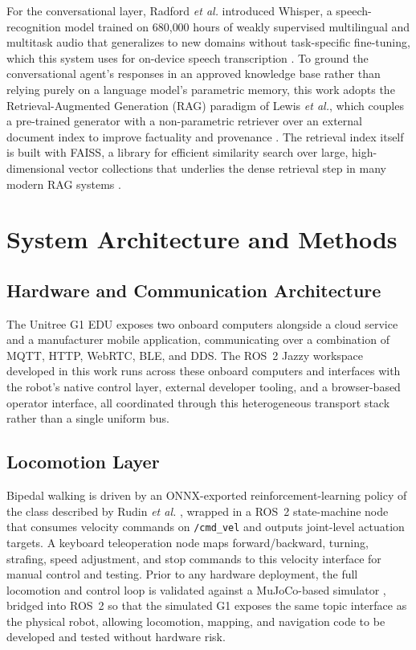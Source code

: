\documentclass[10pt,twocolumn]{article}
\begin{document}
For the conversational layer, Radford \emph{et al.} introduced Whisper, a speech-recognition model trained on 680{,}000 hours of weakly supervised multilingual and multitask audio that generalizes to new domains without task-specific fine-tuning, which this system uses for on-device speech transcription \cite{radford2023whisper}. To ground the conversational agent's responses in an approved knowledge base rather than relying purely on a language model's parametric memory, this work adopts the Retrieval-Augmented Generation (RAG) paradigm of Lewis \emph{et al.}, which couples a pre-trained generator with a non-parametric retriever over an external document index to improve factuality and provenance \cite{lewis2020rag}. The retrieval index itself is built with FAISS, a library for efficient similarity search over large, high-dimensional vector collections that underlies the dense retrieval step in many modern RAG systems \cite{johnson2019faiss}.

\section{System Architecture and Methods}

\subsection{Hardware and Communication Architecture}
The Unitree G1 EDU exposes two onboard computers alongside a cloud service and a manufacturer mobile application, communicating over a combination of MQTT, HTTP, WebRTC, BLE, and DDS. The ROS~2 Jazzy workspace developed in this work runs across these onboard computers and interfaces with the robot's native control layer, external developer tooling, and a browser-based operator interface, all coordinated through this heterogeneous transport stack rather than a single uniform bus.

\subsection{Locomotion Layer}
Bipedal walking is driven by an ONNX-exported reinforcement-learning policy of the class described by Rudin \emph{et al.} \cite{rudin2022walk}, wrapped in a ROS~2 state-machine node that consumes velocity commands on \texttt{/cmd\_vel} and outputs joint-level actuation targets. A keyboard teleoperation node maps forward/backward, turning, strafing, speed adjustment, and stop commands to this velocity interface for manual control and testing. Prior to any hardware deployment, the full locomotion and control loop is validated against a MuJoCo-based simulator \cite{todorov2012mujoco}, bridged into ROS~2 so that the simulated G1 exposes the same topic interface as the physical robot, allowing locomotion, mapping, and navigation code to be developed and tested without hardware risk.
\end{document}
